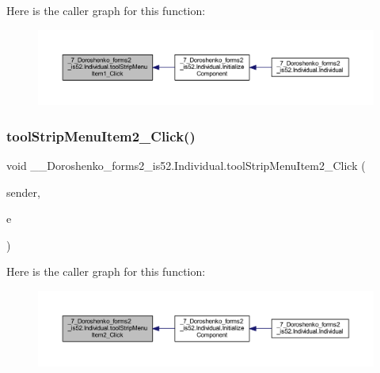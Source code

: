 Here is the caller graph for this function\+:
\nopagebreak
\begin{figure}[H]
\begin{center}
\leavevmode
\includegraphics[width=350pt]{class__7___doroshenko__forms2__is52_1_1_individual_a1457fce6b1dde96e8f73fb4b60f50793_icgraph}
\end{center}
\end{figure}
\hypertarget{class__7___doroshenko__forms2__is52_1_1_individual_ac870b8e07b603d4fe209908fe7e4edcf}{}\label{class__7___doroshenko__forms2__is52_1_1_individual_ac870b8e07b603d4fe209908fe7e4edcf} 
\subsubsection{\texorpdfstring{tool\+Strip\+Menu\+Item2\+\_\+\+Click()}{toolStripMenuItem2\_Click()}}
{\footnotesize\ttfamily void \+\_\+\_\+\+Doroshenko\+\_\+forms2\+\_\+is52.\+Individual.\+tool\+Strip\+Menu\+Item2\+\_\+\+Click (\begin{DoxyParamCaption}\item[{object}]{sender,  }\item[{Event\+Args}]{e }\end{DoxyParamCaption})\hspace{0.3cm}{\ttfamily [private]}}

Here is the caller graph for this function\+:
\nopagebreak
\begin{figure}[H]
\begin{center}
\leavevmode
\includegraphics[width=350pt]{class__7___doroshenko__forms2__is52_1_1_individual_ac870b8e07b603d4fe209908fe7e4edcf_icgraph}
\end{center}
\end{figure}


